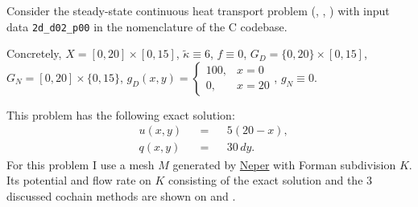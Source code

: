 \begin{example}
  \label{cmc/diffusion/continuous/steady_state/examples/2d_d02_p00-example}
  Consider the steady-state continuous heat transport problem
  (,
   ,
   )
  with input data \verb|2d_d02_p00| in the nomenclature of the C codebase.

  Concretely,
    $X = [0, 20] \times [0, 15]$,
    $\tilde{\kappa} \equiv 6$,
    $f \equiv 0$,
    $G_D = \{0, 20\} \times [0, 15]$,
    $G_N = [0, 20] \times \{0, 15\}$,
    $g_D(x, y) = \begin{cases} 100, & x = 0 \\ 0, & x = 20 \end{cases}$,
    $g_N \equiv 0$.

  This problem has the following exact solution:
  \begin{subequations}
    \begin{alignat}{3}
      & u(x, y) && = && 5 (20 - x), \\
      & q(x, y) && = && 30 \, d y.
    \end{alignat}
  \end{subequations}
  For this problem I use a mesh $M$ generated by
  \href{https://neper.info/}{Neper} with Forman subdivision $K$.
  Its potential and flow rate on $K$ consisting of the exact solution and the
  $3$ discussed cochain methods are shown on
  and
  .
\end{example}
